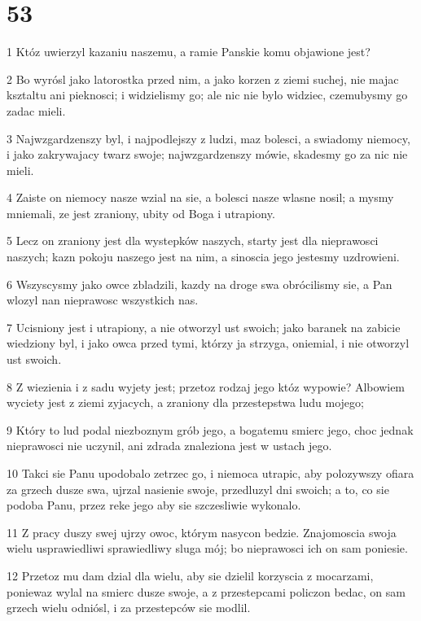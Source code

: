 \chapter{53}

\par 1 Któz uwierzyl kazaniu naszemu, a ramie Panskie komu objawione jest?
\par 2 Bo wyrósl jako latorostka przed nim, a jako korzen z ziemi suchej, nie majac ksztaltu ani pieknosci; i widzielismy go; ale nic nie bylo widziec, czemubysmy go zadac mieli.
\par 3 Najwzgardzenszy byl, i najpodlejszy z ludzi, maz bolesci, a swiadomy niemocy, i jako zakrywajacy twarz swoje; najwzgardzenszy mówie, skadesmy go za nic nie mieli.
\par 4 Zaiste on niemocy nasze wzial na sie, a bolesci nasze wlasne nosil; a mysmy mniemali, ze jest zraniony, ubity od Boga i utrapiony.
\par 5 Lecz on zraniony jest dla wystepków naszych, starty jest dla nieprawosci naszych; kazn pokoju naszego jest na nim, a sinoscia jego jestesmy uzdrowieni.
\par 6 Wszyscysmy jako owce zbladzili, kazdy na droge swa obrócilismy sie, a Pan wlozyl nan nieprawosc wszystkich nas.
\par 7 Ucisniony jest i utrapiony, a nie otworzyl ust swoich; jako baranek na zabicie wiedziony byl, i jako owca przed tymi, którzy ja strzyga, oniemial, i nie otworzyl ust swoich.
\par 8 Z wiezienia i z sadu wyjety jest; przetoz rodzaj jego któz wypowie? Albowiem wyciety jest z ziemi zyjacych, a zraniony dla przestepstwa ludu mojego;
\par 9 Który to lud podal niezboznym grób jego, a bogatemu smierc jego, choc jednak nieprawosci nie uczynil, ani zdrada znaleziona jest w ustach jego.
\par 10 Takci sie Panu upodobalo zetrzec go, i niemoca utrapic, aby polozywszy ofiara za grzech dusze swa, ujrzal nasienie swoje, przedluzyl dni swoich; a to, co sie podoba Panu, przez reke jego aby sie szczesliwie wykonalo.
\par 11 Z pracy duszy swej ujrzy owoc, którym nasycon bedzie. Znajomoscia swoja wielu usprawiedliwi sprawiedliwy sluga mój; bo nieprawosci ich on sam poniesie.
\par 12 Przetoz mu dam dzial dla wielu, aby sie dzielil korzyscia z mocarzami, poniewaz wylal na smierc dusze swoje, a z przestepcami policzon bedac, on sam grzech wielu odniósl, i za przestepców sie modlil.

